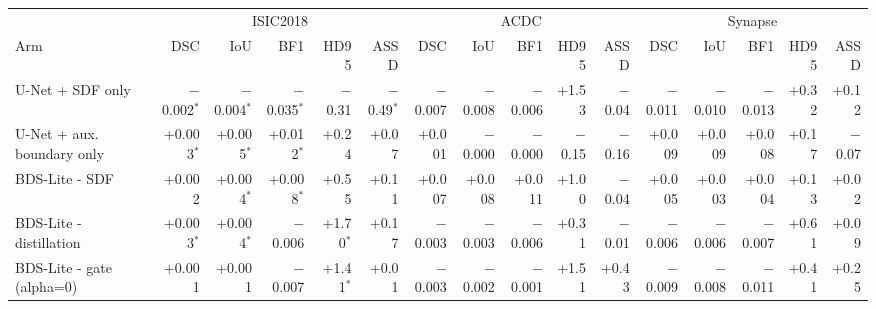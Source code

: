 \begin{tabular}{lrrrrrrrrrrrrrrr}
\toprule
 & \multicolumn{5}{c}{ISIC2018} & \multicolumn{5}{c}{ACDC} & \multicolumn{5}{c}{Synapse} \\
Arm & DSC & IoU & BF1 & HD95 & ASSD & DSC & IoU & BF1 & HD95 & ASSD & DSC & IoU & BF1 & HD95 & ASSD \\
\midrule
U-Net + SDF only & $-$0.002$^{*}$ & $-$0.004$^{*}$ & $-$0.035$^{*}$ & $-$0.31 & $-$0.49$^{*}$ & $-$0.007 & $-$0.008 & $-$0.006 & +1.53 & $-$0.04 & $-$0.011 & $-$0.010 & $-$0.013 & +0.32 & +0.12 \\
U-Net + aux. boundary only & +0.003$^{*}$ & +0.005$^{*}$ & +0.012$^{*}$ & +0.24 & +0.07 & +0.001 & $-$0.000 & $-$0.000 & $-$0.15 & $-$0.16 & +0.009 & +0.009 & +0.008 & +0.17 & $-$0.07 \\
BDS-Lite - SDF & +0.002 & +0.004$^{*}$ & +0.008$^{*}$ & +0.55 & +0.11 & +0.007 & +0.008 & +0.011 & +1.00 & $-$0.04 & +0.005 & +0.003 & +0.004 & +0.13 & +0.02 \\
BDS-Lite - distillation & +0.003$^{*}$ & +0.004$^{*}$ & $-$0.006 & +1.70$^{*}$ & +0.17 & $-$0.003 & $-$0.003 & $-$0.006 & +0.31 & $-$0.01 & $-$0.006 & $-$0.006 & $-$0.007 & +0.61 & +0.09 \\
BDS-Lite - gate (alpha=0) & +0.001 & +0.001 & $-$0.007 & +1.41$^{*}$ & +0.01 & $-$0.003 & $-$0.002 & $-$0.001 & +1.51 & +0.43 & $-$0.009 & $-$0.008 & $-$0.011 & +0.41 & +0.25 \\
\bottomrule
\end{tabular}
